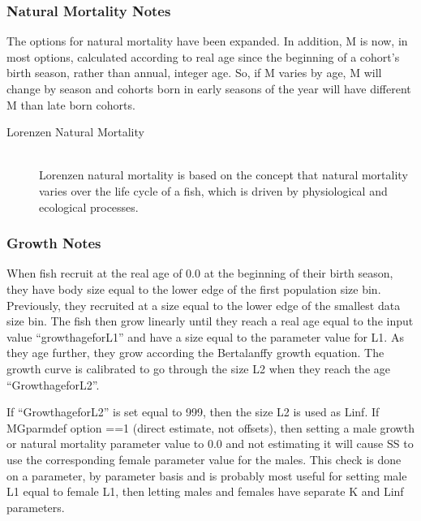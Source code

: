 \subsubsection{Natural Mortality Notes}
The options for natural mortality have been expanded.  In addition, M is now, in most options, calculated according to real age since the beginning of a cohort’s birth season, rather than annual, integer age.  So, if M varies by age, M will change by season and cohorts born in early seasons of the year will have different M than late born cohorts.

\hypertarget{Lorenzen}{}
\begin{description}
	\item[Lorenzen Natural Mortality]\hfil\\
	Lorenzen natural mortality is based on the concept that natural mortality varies over the life cycle of a fish, which is driven by physiological and ecological processes.
\end{description}

\subsubsection{Growth Notes}
\hypertarget{A1}{}
When fish recruit at the real age of 0.0 at the beginning of their birth season, they have body size equal to the lower edge of the first population size bin.  Previously, they recruited at a size equal to the lower edge of the smallest data size bin.  The fish then grow linearly until they reach a real age equal to the input value “growth\textunderscore age\textunderscore for\textunderscore L1” and have a size equal to the parameter value for L1.  As they age further, they grow according the Bertalanffy growth equation.  The growth curve is calibrated to go through the size L2 when they reach the age “Growth\textunderscore age\textunderscore for\textunderscore L2”.

If “Growth\textunderscore age\textunderscore for\textunderscore L2” is set equal to 999, then the size L2 is used as Linf.  If MGparm\textunderscore def option ==1 (direct estimate, not offsets), then setting a male growth or natural mortality parameter value to 0.0 and not estimating it will cause SS to use the corresponding female parameter value for the males. This check is done on a parameter, by parameter basis and is probably most useful for setting male L1 equal to female L1, then letting males and females have separate K and Linf parameters.

